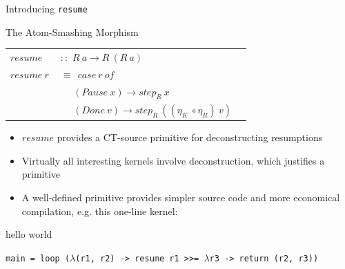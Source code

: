 \documentclass{beamer}
\begin{document}
\begin{frame}{Introducing \texttt{resume}}

\begin{structure}{The Atom-Smashing Morphism}
\begin{onlinebox}{9cm}

\begin{tabular}[t]{lll}
$resume$ &$::$ $R\ a \rightarrow R\ (R\ a)$\\
$resume\ r\ $&$\equiv \ \ case\ r\ of$\\
&$\ \ \ \  \ \ (Pause\ x) \rightarrow step_R\ x$\\
&$\ \ \ \ \ \ (Done\ v) \rightarrow step_R\ ((\eta_K\ \circ \eta_R)\ v)$\\

\end{tabular}

\end{onlinebox}
\end{structure}


\begin{itemize}

\item{$resume$ provides a CT-source primitive for deconstructing resumptions}

\item{Virtually all interesting kernels involve deconstruction, which justifies a primitive}

\item{A well-defined primitive provides simpler source code and more economical compilation, e.g. this one-line kernel:}
\end{itemize}

\begin{structure}{hello world}
\begin{onlinebox}{11cm}

\begin{scriptsize}

\texttt{main = loop ($\lambda$(r1, r2) -> resume r1 >>= $\lambda$r3 -> return (r2, r3))}

\end{scriptsize}

\end{onlinebox}
\end{structure}


\end{frame}
\end{document}

